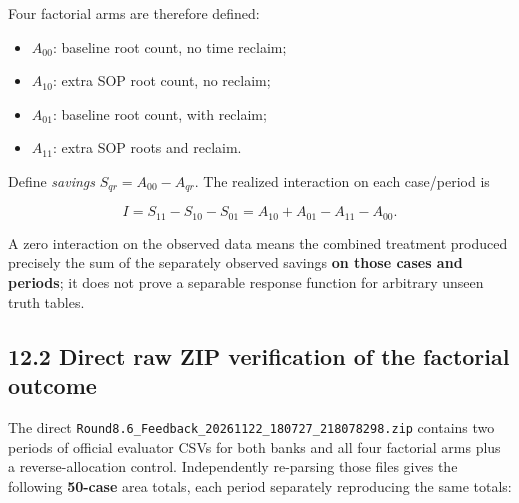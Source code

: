 \documentclass[a4paper,10pt]{article}
\providecommand{\tightlist}{\setlength{\itemsep}{0pt}\setlength{\parskip}{0pt}}
\theoremstyle{definition}
\theoremstyle{remark}
\begin{document}
Four factorial arms are therefore defined:

\begin{itemize}
\tightlist
\item
  \(A_{00}\): baseline root count, no time reclaim;
\item
  \(A_{10}\): extra SOP root count, no reclaim;
\item
  \(A_{01}\): baseline root count, with reclaim;
\item
  \(A_{11}\): extra SOP roots and reclaim.
\end{itemize}

Define \emph{savings} \(S_{qr}=A_{00}-A_{qr}\). The realized interaction on each case/period is

\[
I=S_{11}-S_{10}-S_{01}
=A_{10}+A_{01}-A_{11}-A_{00}.
\]

A zero interaction on the observed data means the combined treatment produced precisely the sum of the separately observed savings \textbf{on those cases and periods}; it does not prove a separable response function for arbitrary unseen truth tables.

\subsection{12.2 Direct raw ZIP verification of the factorial outcome}\label{direct-raw-zip-verification-of-the-factorial-outcome}

The direct \texttt{Round8.6\_Feedback\_20261122\_180727\_218078298.zip} contains two periods of official evaluator CSVs for both banks and all four factorial arms plus a reverse-allocation control. Independently re-parsing those files gives the following \textbf{50-case} area totals, each period separately reproducing the same totals:
\end{document}
